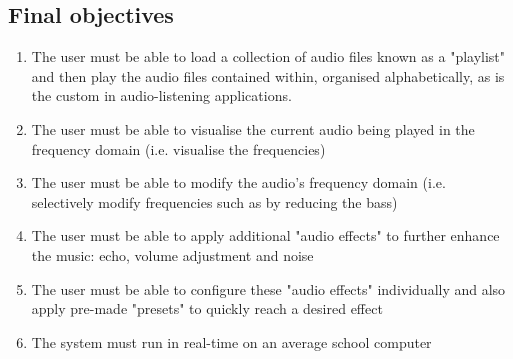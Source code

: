 \pagebreak
\subsection{Final objectives}
\begin{enumerate}
	\item  The user must be able to load a collection of audio files known as a "playlist" and then play the audio files contained within, organised alphabetically, as is the custom in audio-listening applications.
	\item  The user must be able to visualise the current audio being played in the frequency domain (i.e. visualise the frequencies)
	\item The user must be able to modify the audio's frequency domain (i.e. selectively modify frequencies such as by reducing the bass)
	\item The user must be able to apply additional "audio effects" to further enhance the music: echo, volume adjustment and noise
	\item The user must be able to configure these "audio effects" individually and also apply pre-made "presets" to quickly reach a desired effect
	\item  The system must run in real-time on an average school computer
\end{enumerate}